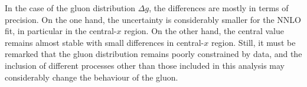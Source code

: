 

In the case of the gluon distribution $\Delta g$, the differences are mostly in terms of precision. On the one hand, the uncertainty is considerably smaller for the NNLO fit, in particular in the central-$x$ region. On the other hand, the central value remains almost stable with small differences in central-$x$ region. Still, it must be remarked that the gluon distribution remains poorly constrained by data, and the inclusion of different processes other than those included in this analysis may considerably change the behaviour of the gluon.%

